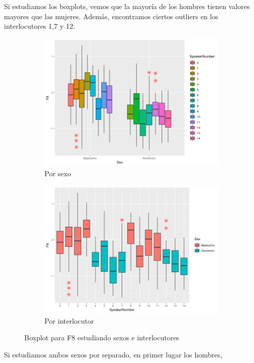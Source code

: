 Si estudiamos los boxplots, vemos que la mayoría de los hombres tienen valores mayores que las mujeres. Además, encontramos ciertos outliers en los interlocutores 1,7 y 12.

\begin{figure}[H]
	\centering
	\begin{subfigure}{.5\textwidth}
		\centering
		\includegraphics[width=.9\linewidth]{bps8.png}
		\caption{Por sexo}
		\label{fig:bps8}
	\end{subfigure}%
	\begin{subfigure}{.5\textwidth}
		\centering
		\includegraphics[width=.9\linewidth]{bpsn8.png}
		\caption{Por interlocutor}
		\label{fig:bpsn8}
	\end{subfigure}
	\caption{Boxplot para F8 estudiando sexos e interlocutores}
	\label{fig:bf8}
\end{figure}

Si estudiamos ambos sexos por separado, en primer lugar los hombres,

